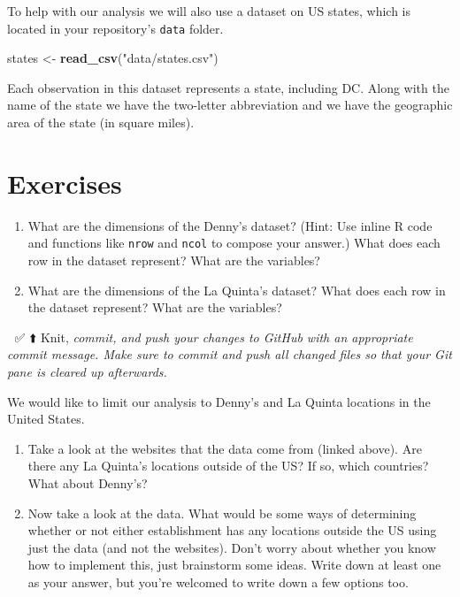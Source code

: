 \documentclass[
]{article}
\newenvironment{Shaded}{\begin{snugshade}}{\end{snugshade}}
\newcommand{\FunctionTok}[1]{\textcolor[rgb]{0.13,0.29,0.53}{\textbf{#1}}}
\newcommand{\NormalTok}[1]{#1}
\newcommand{\OtherTok}[1]{\textcolor[rgb]{0.56,0.35,0.01}{#1}}
\newcommand{\StringTok}[1]{\textcolor[rgb]{0.31,0.60,0.02}{#1}}
\begin{document}
To help with our analysis we will also use a dataset on US states, which
is located in your repository's \texttt{data} folder.

\begin{Shaded}
\begin{Highlighting}[]
\NormalTok{states }\OtherTok{\textless{}{-}} \FunctionTok{read\_csv}\NormalTok{(}\StringTok{"data/states.csv"}\NormalTok{)}
\end{Highlighting}
\end{Shaded}

Each observation in this dataset represents a state, including DC. Along
with the name of the state we have the two-letter abbreviation and we
have the geographic area of the state (in square miles).

\section{Exercises}\label{exercises}

\begin{enumerate}
\def\labelenumi{\arabic{enumi}.}
\item
  What are the dimensions of the Denny's dataset? (Hint: Use inline R
  code and functions like \texttt{nrow} and \texttt{ncol} to compose
  your answer.) What does each row in the dataset represent? What are
  the variables?
\item
  What are the dimensions of the La Quinta's dataset? What does each row
  in the dataset represent? What are the variables?
\end{enumerate}

🧶 ✅ ⬆️ Knit, \emph{commit, and push your changes to GitHub with an
appropriate commit message. Make sure to commit and push all changed
files so that your Git pane is cleared up afterwards.}

We would like to limit our analysis to Denny's and La Quinta locations
in the United States.

\begin{enumerate}
\def\labelenumi{\arabic{enumi}.}
\setcounter{enumi}{2}
\item
  Take a look at the websites that the data come from (linked above).
  Are there any La Quinta's locations outside of the US? If so, which
  countries? What about Denny's?
\item
  Now take a look at the data. What would be some ways of determining
  whether or not either establishment has any locations outside the US
  using just the data (and not the websites). Don't worry about whether
  you know how to implement this, just brainstorm some ideas. Write down
  at least one as your answer, but you're welcomed to write down a few
  options too.
\end{enumerate}
\end{document}
